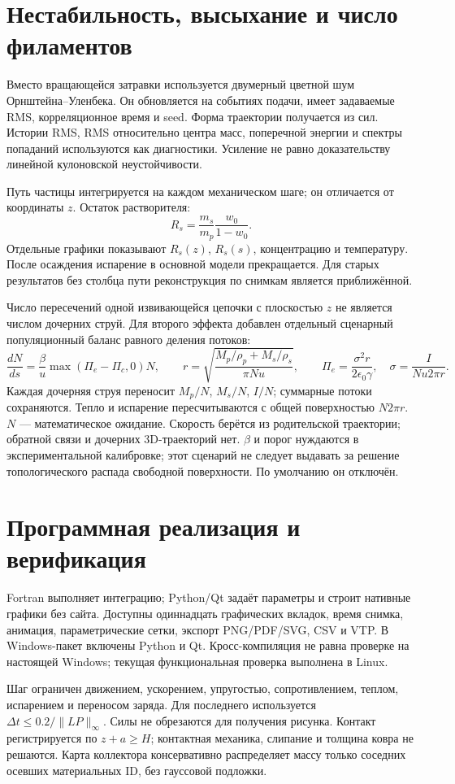 \documentclass[12pt,a4paper]{article}
\begin{document}
\section{Нестабильность, высыхание и число филаментов}
Вместо вращающейся затравки используется двумерный цветной шум
Орнштейна--Уленбека. Он обновляется на событиях подачи, имеет задаваемые
RMS, корреляционное время и seed. Форма траектории получается из сил.
Истории RMS, RMS относительно центра масс, поперечной энергии и спектры
попаданий используются как диагностики. Усиление не равно доказательству
линейной кулоновской неустойчивости.

Путь частицы интегрируется на каждом механическом шаге; он отличается от
координаты $z$. Остаток растворителя:
\[
 R_s=\frac{m_s}{m_p}\frac{w_0}{1-w_0}.
\]
Отдельные графики показывают $R_s(z)$, $R_s(s)$, концентрацию и температуру.
После осаждения испарение в основной модели прекращается. Для старых
результатов без столбца пути реконструкция по снимкам является приближённой.

Число пересечений одной извивающейся цепочки с плоскостью $z$ не является
числом дочерних струй. Для второго эффекта добавлен отдельный сценарный
популяционный баланс равного деления потоков:
\[
 \frac{dN}{ds}=\frac{\beta}{u}\max(\Pi_e-\Pi_c,0)N,\qquad
 r=\sqrt{\frac{M_p/\rho_p+M_s/\rho_s}{\pi Nu}},\qquad
 \Pi_e=\frac{\sigma^2r}{2\epsilon_0\gamma},\quad
 \sigma=\frac{I}{Nu2\pi r}.
\]
Каждая дочерняя струя переносит $M_p/N$, $M_s/N$, $I/N$; суммарные потоки
сохраняются. Тепло и испарение пересчитываются с общей поверхностью $N2\pi r$.
$N$ — математическое ожидание. Скорость берётся из родительской траектории;
обратной связи и дочерних 3D-траекторий нет. $\beta$ и порог нуждаются в
экспериментальной калибровке; этот сценарий не следует выдавать за решение
топологического распада свободной поверхности. По умолчанию он отключён.

\section{Программная реализация и верификация}
Fortran выполняет интеграцию; Python/Qt задаёт параметры и строит нативные
графики без сайта. Доступны одиннадцать графических вкладок, время снимка,
анимация, параметрические сетки, экспорт PNG/PDF/SVG, CSV и VTP.
В Windows-пакет включены Python и Qt. Кросс-компиляция не равна проверке
на настоящей Windows; текущая функциональная проверка выполнена в Linux.

Шаг ограничен движением, ускорением, упругостью, сопротивлением, теплом,
испарением и переносом заряда. Для последнего используется
$\Delta t\leq0.2/\|LP\|_\infty$. Силы не обрезаются для получения рисунка.
Контакт регистрируется по $z+a\geq H$; контактная механика, слипание и
толщина ковра не решаются. Карта коллектора консервативно распределяет
массу только соседних осевших материальных ID, без гауссовой подложки.
\end{document}
